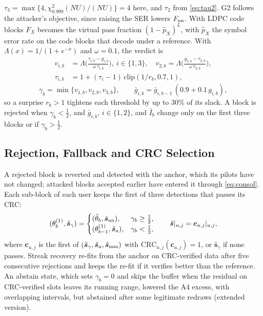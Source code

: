 \documentclass[journal]{IEEEtran}
\theoremstyle{remark}
\begin{document}
$\tau_3=\max\{4,\chi^2_{0.999}(NU)/(NU)\}=4$ here, and $\tau_2$ from \eqref{eq:tau2}. G2 follows the
attacker's objective, since raising the SER lowers $F_{\rm nn}$. With LDPC code blocks $F_X$ becomes
the virtual pass fraction $(1-\hat p_X)^L$, with $\hat p_X$ the symbol error rate on the code blocks that
decode under a reference. With $\Lambda(x)=1/(1+e^{-x})$ and $\omega=0.1$, the verdict is
\begin{equation}\label{eq:softstep}
\begin{aligned}
v_{i,b}&=\Lambda\Big(\frac{\tau_{i,b}-g_{i,b}}{\omega\,\tau_{i,b}}\Big),\ i\in\{1,3\},\quad
v_{2,b}=\Lambda\Big(\frac{g_{2,b}-\tau_{2,b}}{\omega\,\tau_{2,b}}\Big),\\
\tau_{i,b}&=1+(\tau_i-1)\,\mathrm{clip}(1/r_b,0.7,1),
\end{aligned}
\end{equation}
\begin{equation}\label{eq:verdict}
\gamma_b=\min\{v_{1,b},v_{2,b},v_{3,b}\},\qquad \bar g_{i,b}=\bar g_{i,b-1}\,(0.9+0.1\,g_{i,b}),
\end{equation}
so a surprise $r_b>1$ tightens each threshold by up to $30\%$ of its slack. A block is rejected
when $\gamma_b<\tfrac12$, and $\bar g_{i,b}$, $i\in\{1,2\}$, and $\bar I_b$ change only on the first three blocks or
if $\gamma_b>\tfrac12$.

\subsection{Rejection, Fallback and CRC Selection}\label{sec:select}
A rejected block is reverted and detected with the anchor, which its pilots have not changed; attacked
blocks accepted earlier have entered it through \eqref{eq:consol}. Each
sub-block of each user keeps the first of three detections that passes its CRC:
\begin{equation}\label{eq:select}
(\theta^{(1)}_b,\hat{\bm s}_\gamma)=
\begin{cases}(\check\theta_b,\hat{\bm s}_{\rm nn}),&\gamma_b\ge\tfrac12,\\
(\theta^{(1)}_{b-1},\hat{\bm s}_a),&\gamma_b<\tfrac12,\end{cases}\qquad
\hat{\bm s}|_{u,j}=\bm c_{u,j}|_{u,j},
\end{equation}
where $\bm c_{u,j}$ is the first of $(\hat{\bm s}_\gamma,\hat{\bm s}_a,\hat{\bm s}_{\rm mm})$ with
$\mathrm{CRC}_{u,j}(\bm c_{u,j})=1$, or $\hat{\bm s}_\gamma$ if none passes. Streak
recovery re-fits from the anchor on CRC-verified data after five consecutive rejections and keeps the
re-fit if it verifies better than the reference. An abstain state, which sets $\gamma_b=0$ and skips
the buffer when the residual on CRC-verified slots leaves its running range, lowered the A4
excess, with overlapping intervals, but abstained after some legitimate redraws (extended version).
\end{document}
